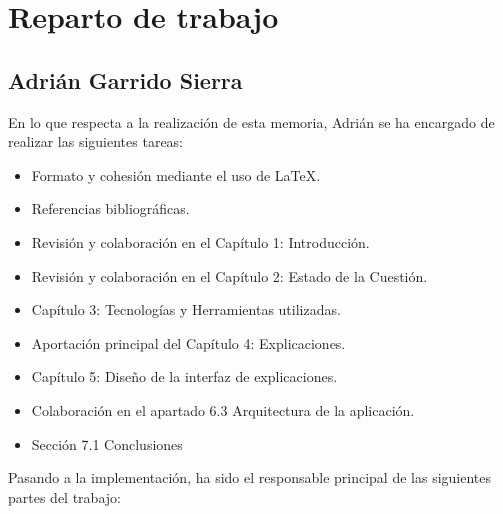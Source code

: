 \chapter{Reparto de trabajo}
\label{Appendix:Key1}

\section{Adrián Garrido Sierra}

En lo que respecta a la realización de esta memoria, Adrián se ha encargado de realizar las siguientes tareas:

\begin{itemize}
\item Formato y cohesión mediante el uso de LaTeX.

\item Referencias bibliográficas.

\item Revisión y colaboración en el Capítulo 1: Introducción.

\item Revisión y colaboración en el Capítulo 2: Estado de la Cuestión.

\item Capítulo 3: Tecnologías y Herramientas utilizadas.

\item Aportación principal del Capítulo 4: Explicaciones.

\item Capítulo 5: Diseño de la interfaz de explicaciones.

\item Colaboración en el apartado 6.3 Arquitectura de la aplicación.

\item Sección 7.1 Conclusiones\\
\end{itemize}

Pasando a la implementación, ha sido el responsable principal de las siguientes partes del trabajo:

